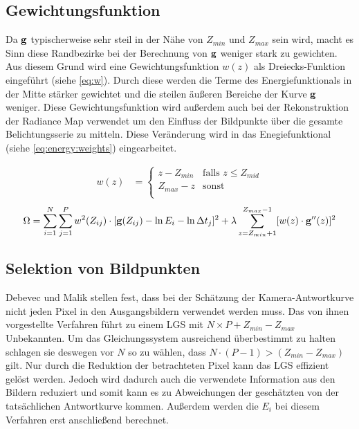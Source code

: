 \subsection{Gewichtungsfunktion}
\label{algo:schwachstellen:gewichtung}
Da $\mathbf g$ typischerweise sehr steil in der Nähe von $Z_{min}$ und $Z_{max}$ sein wird, macht es Sinn diese Randbezirke bei der Berechnung von $\mathbf g$ weniger stark zu gewichten. Aus diesem Grund wird eine Gewichtungsfunktion $w(z)$ als Dreiecks-Funktion eingeführt (siehe \autoref{eq:w}). 
Durch diese werden die Terme des Energiefunktionals in der Mitte stärker gewichtet und die steilen äußeren Bereiche der Kurve $\mathbf g$ weniger. Diese Gewichtungsfunktion wird außerdem auch bei der Rekonstruktion der \gls{Radiance Map} verwendet um den Einfluss der Bildpunkte über die gesamte Belichtungsserie zu mitteln. Diese Veränderung wird in das Enegiefunktional (siehe \autoref{eq:energy:weights}) eingearbeitet.

\begin{align}
\label{eq:w}
w(z) &= \begin{cases} 
z - Z_{min}&  \text{falls } z \leq Z_{mid}  \\ 
Z_{max}-z& \text{sonst}\\
\end{cases}
\end{align}
\begin{equation}
\label{eq:energy:weights}
\Omega = \sum \limits_{i=1}^{N} \sum \limits_{j=1}^{P}w^2(Z_{ij})\cdot[\mathbf g(Z_{ij}) - \ln E_i - \ln \Delta t_j]^2 + \lambda  \sum \limits_{z=Z_{min}+1}^{Z_{max}-1} [w(z) \cdot \mathbf{g}''(z)]^2\\
\end{equation}

\subsection{Selektion von Bildpunkten}
\label{algo:schwachstellen:selektion}
Debevec und Malik stellen fest, dass bei der Schätzung der Kamera-Antwortkurve nicht jeden Pixel in den Ausgangsbildern verwendet werden muss. Das von ihnen vorgestellte Verfahren führt zu einem \gls{LGS} mit $N \times P + Z_{min} - Z_{max}$ Unbekannten. Um das Gleichungssystem ausreichend überbestimmt zu halten schlagen sie deswegen vor $N$ so zu wählen, dass $N\cdot(P-1) > (Z_{min}-Z_{max})$ gilt. Nur durch die Reduktion der betrachteten Pixel kann das \gls{LGS} effizient gelöst werden. Jedoch wird dadurch auch die verwendete Information aus den Bildern reduziert und somit kann es zu Abweichungen der geschätzten von der tatsächlichen Antwortkurve kommen. Außerdem werden die $E_i$ bei diesem Verfahren erst anschließend berechnet.

